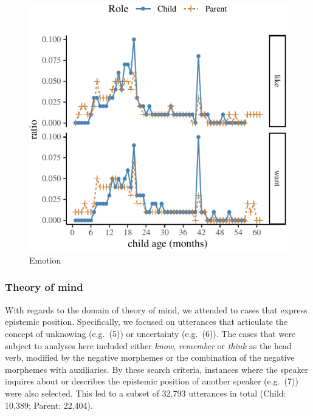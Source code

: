 \documentclass[10pt, letterpaper]{article}
\newenvironment{CodeChunk}{}{}
\begin{document}
\begin{CodeChunk}
\begin{figure}[H]

{\centering \includegraphics{figs/emotion-1} 

}

\caption[Emotion]{Emotion}\label{fig:emotion}
\end{figure}
\end{CodeChunk}

\hypertarget{theory-of-mind}{%
\subsubsection{Theory of mind}\label{theory-of-mind}}

With regards to the domain of theory of mind, we attended to cases that
express epistemic position. Specifically, we focused on utterances that
articulate the concept of unknowing (e.g.~(5)) or uncertainty
(e.g.~(6)). The cases that were subject to analyses here included either
\emph{know}, \emph{remember} or \emph{think} as the head verb, modified
by the negative morphemes or the combination of the negative morphemes
with auxiliaries. By these search criteria, instances where the speaker
inquires about or describes the epistemic position of another speaker
(e.g.~(7)) were also selected. This led to a subset of 32,793 utterances
in total (Child: 10,389; Parent: 22,404).
\end{document}
